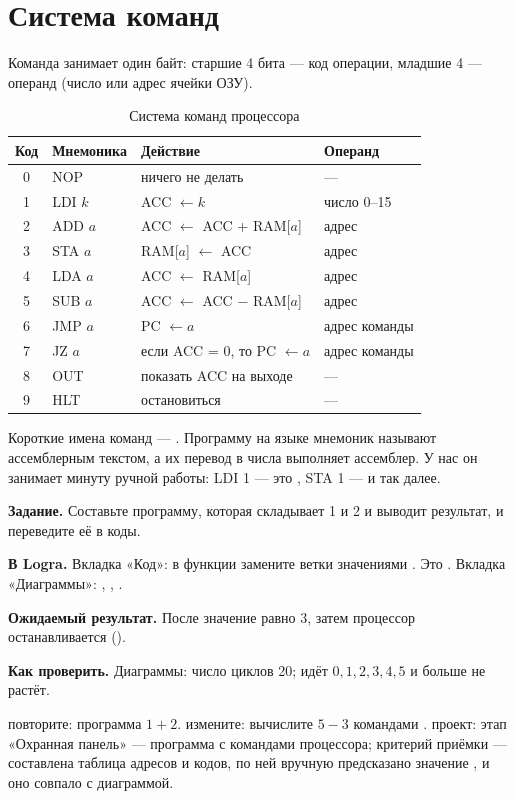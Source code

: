 \section{Система команд}

Команда занимает один байт: старшие 4 бита --- код операции, младшие 4 ---
операнд (число или адрес ячейки ОЗУ).

\begin{table}[H]
\centering
\caption{Система команд процессора}
\small
\begin{tabular}{clll}
\toprule
\textbf{Код} & \textbf{Мнемоника} & \textbf{Действие} & \textbf{Операнд} \\
\midrule
0 & NOP & ничего не делать & --- \\
1 & LDI $k$ & ACC $\leftarrow k$ & число 0--15 \\
2 & ADD $a$ & ACC $\leftarrow$ ACC + RAM[$a$] & адрес \\
3 & STA $a$ & RAM[$a$] $\leftarrow$ ACC & адрес \\
4 & LDA $a$ & ACC $\leftarrow$ RAM[$a$] & адрес \\
5 & SUB $a$ & ACC $\leftarrow$ ACC $-$ RAM[$a$] & адрес \\
6 & JMP $a$ & PC $\leftarrow a$ & адрес команды \\
7 & JZ $a$ & если ACC = 0, то PC $\leftarrow a$ & адрес команды \\
8 & OUT & показать ACC на выходе & --- \\
9 & HLT & остановиться & --- \\
\bottomrule
\end{tabular}
\end{table}

Короткие имена команд --- . Программу на языке мнемоник
называют ассемблерным текстом, а их перевод в числа выполняет ассемблер. У
нас он занимает минуту ручной работы: LDI 1 --- это , STA 1 ---
 и так далее.

\begin{diybox}
\textbf{Задание.} Составьте программу, которая складывает 1 и 2 и выводит результат, и переведите её в коды.

\textbf{В Logra.} Вкладка «Код»: в функции  замените ветки  значениями . Это . Вкладка «Диаграммы»: , , .

\textbf{Ожидаемый результат.} После  значение  равно 3, затем процессор останавливается ().

\textbf{Как проверить.} Диаграммы: число циклов 20;  идёт $0,1,2,3,4,5$ и больше не растёт.

 повторите: программа $1+2$.  измените: вычислите $5-3$ командами .  проект: этап «Охранная панель» --- программа с командами процессора; критерий приёмки --- составлена таблица адресов и кодов, по ней вручную предсказано значение , и оно совпало с диаграммой.
\end{diybox}

